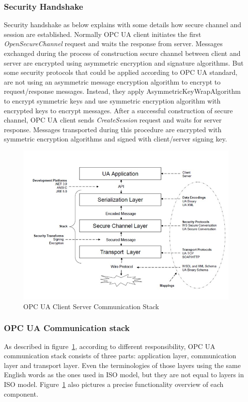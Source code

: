 \documentclass[]{llncs}
\begin{document}
\subsubsection{Security Handshake}
Security handshake as below explains with some details how secure channel and session are established. Normally OPC UA client initiates the first \emph{OpenSecureChannel} request and waits the response from server. Messages exchanged during the process of construction secure channel between client and server are encrypted using asymmetric encryption and signature algorithms. But some security protocols that could be applied according to OPC UA standard, are not using an asymmetric message encryption algorithm to encrypt to request/response messages. Instead, they apply AsymmetricKeyWrapAlgorithm to encrypt symmetric keys and use symmetric encryption algorithm with encrypted keys to encrypt messages. After a successful construction of secure channel, OPC UA client sends \emph{CreateSession} request and waits for server response. Messages transported during this procedure are encrypted with symmetric encryption algorithms and signed with client/server signing key.
\begin{figure}[!htbp]
	\centering
	\includegraphics[width=1\textwidth]{opc_ua_commstack.jpg}
		\caption[ ]{OPC UA Client Server Communication Stack\cite{O2}}
	\label{fig:opc_ua_commstack}
\end{figure}

\subsubsection{OPC UA Communication stack}
As described in figure~\ref{fig:opc_ua_commstack}, according to different responsibility, OPC UA communication stack consists of three parts: application layer, communication layer and transport layer. Even the terminologies of those layers using the same English words as the ones used in ISO model, but they are not equal to layers in ISO model. Figure~\ref{fig:opc_ua_commstack} also pictures a precise functionality overview of each component.
\end{document}
